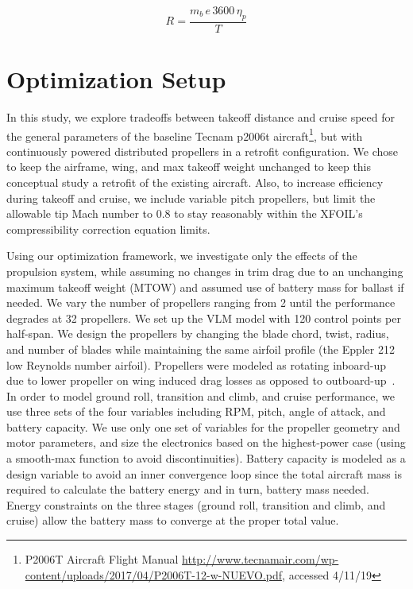 \documentclass[conf]{new-aiaa}
\begin{document}
\begin{equation}
    \label{eq:range1}
    R = \frac{m_{b} \, e \, 3600 \, \eta_{p}}{T}
\end{equation}




\section{Optimization Setup}
\label{chp:OptimizationSetup}


In this study, we explore tradeoffs between takeoff distance and cruise speed for the general parameters of the baseline Tecnam p2006t aircraft\footnote{\label{p2006t} P2006T Aircraft Flight Manual \href{http://www.tecnamair.com/wp-content/uploads/2017/04/P2006T-12-w-NUEVO.pdf}{http://www.tecnamair.com/wp-content/uploads/2017/04/P2006T-12-w-NUEVO.pdf}, accessed 4/11/19}, but with continuously powered distributed propellers in a retrofit configuration. We chose to keep the airframe, wing, and max takeoff weight unchanged to keep this conceptual study a retrofit of the existing aircraft. Also, to increase efficiency during takeoff and cruise, we include variable pitch propellers, but limit the allowable tip Mach number to 0.8 to stay reasonably within the XFOIL's compressibility correction equation limits.

Using our optimization framework, we investigate only the effects of the propulsion system, while assuming no changes in trim drag due to an unchanging maximum takeoff weight (MTOW) and assumed use of battery mass for ballast if needed. We vary the number of propellers ranging from 2 until the performance degrades at 32 propellers. We set up the VLM model with 120 control points per half-span. We design the propellers by changing the blade chord, twist, radius, and number of blades while maintaining the same airfoil profile (the Eppler 212 low Reynolds number airfoil). Propellers were modeled as rotating inboard-up due to lower propeller on wing induced drag losses as opposed to outboard-up~\cite{Kroo:1986aa}. In order to model ground roll, transition and climb, and cruise performance, we use three sets of the four variables including RPM, pitch, angle of attack, and battery capacity. We use only one set of variables for the propeller geometry and motor parameters, and size the electronics based on the highest-power case (using a smooth-max function to avoid discontinuities). Battery capacity is modeled as a design variable to avoid an inner convergence loop since the total aircraft mass is required to calculate the battery energy and in turn, battery mass needed. Energy constraints on the three stages (ground roll, transition and climb, and cruise) allow the battery mass to converge at the proper total value.
\end{document}
